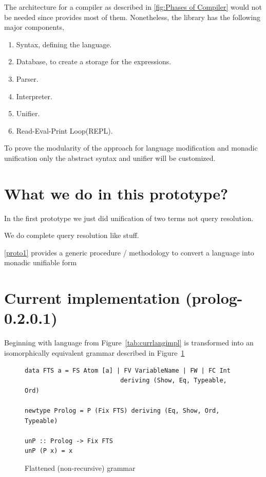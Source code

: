 \documentclass[thesis-solanki.tex]{subfiles}
\begin{document}
The architecture for a compiler as described in \ref{fig:Phases of Compiler} would not be needed since  provides most of
them. Nonetheless, the library has the following major components,

\begin{enumerate}
\item Syntax, defining the language.

\item Database, to create a storage for the expressions.

\item Parser.

\item Interpreter.

\item Unifier.

\item Read-Eval-Print Loop(REPL). 
\end{enumerate}

To prove the modularity of the approach for language modification and monadic unification only the abstract syntax and unifier will be
customized.


\clearpage
\section{What we do in this prototype?}
In the first prototype we just did unification of two terms not query resolution.

We do complete  query resolution like stuff.

\ref{proto1} provides a generic procedure / methodology to convert a language into monadic unifiable form

\clearpage
\section{Current implementation (prolog-0.2.0.1)}

Beginning with language from Figure~\ref{tab:currlangimpl} is transformed into an isomorphically equivalent grammar described in 
Figure~\ref{tab:flatgrp0201}

\begin{figure}[h]
\begin{verbatim}
data FTS a = FS Atom [a] | FV VariableName | FW | FC Int
                          deriving (Show, Eq, Typeable, Ord)

newtype Prolog = P (Fix FTS) deriving (Eq, Show, Ord, Typeable)

unP :: Prolog -> Fix FTS
unP (P x) = x
\end{verbatim}
\caption{Flattened (non-recursive) grammar}
\label{tab:flatgrp0201}
\end{figure}
\end{document}
